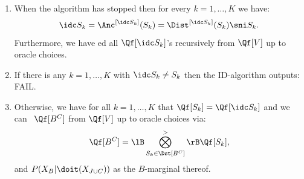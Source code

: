 \begin{Alg}[ID-algorithm]
\begin{enumerate}
\begin{enumerate}
                \item If $D_{k,\ell}=A_{k,\ell}$ or $A_{k,\ell+1}=D_{k,\ell}$ then stop for this $k$ and put: 
                    \[ \idc S_k:=D_{k,\ell}.\]
                \item[] Otherwise, repeat with: $\ell \leftarrow \ell +1$.
            \end{enumerate}
                \item When the algorithm has stopped then for every $k=1,\dots,K$ we have:
                    \[ \idc S_k=\Anc^{[\idc S_k]}(S_k)=\Dist^{[\idc S_k]}(S_k) \sni S_k.\]
                    Furthermore, we have \track ed all $\Qf[\idc S_k]$'s recursively from $\Qf[V]$ up to oracle choices.
                \item If there is any $k=1,\dots,K$ with $\idc S_k \neq S_k$ then the ID-algorithm outputs: FAIL.
                \item Otherwise, we have for all $k=1,\dots,K$ that $\Qf[S_k]=\Qf[\idc S_k]$ and we can \track\
                    $\Qf[B^C]$ from $\Qf[V]$ up to oracle choices via:
                    \[ \Qf[B^C] = \lB \bigotimes_{S_k \in \Dst[B^C]}^> \rB \Qf[S_k],\]
                    and $P(X_B|\doit(X_{J \cup C}))$ as the $B$-marginal thereof.
    \end{enumerate}
\end{Alg}



